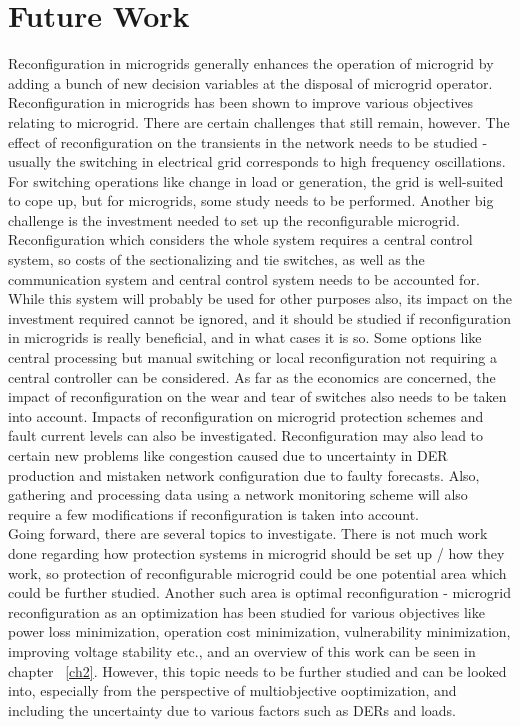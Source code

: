 \chapter{Future Work} \label{ch4}

Reconfiguration in microgrids generally enhances the operation of microgrid by adding a bunch of new decision variables at the disposal of microgrid operator. Reconfiguration in microgrids has been shown to improve various objectives relating to microgrid. 
There are certain challenges that still remain, however. The effect of reconfiguration on the transients in the network needs to be studied - usually the switching in electrical grid corresponds to high frequency oscillations. For switching operations like change in load or generation, the grid is well-suited to cope up, but for microgrids, some study needs to be performed\citep{mgrj18}. Another big challenge is the investment needed to set up the reconfigurable microgrid. Reconfiguration which considers the whole system requires a central control system, so costs of the sectionalizing and tie switches, as well as the communication system and central control system needs to be accounted for. While this system will probably be used for other purposes also, its impact on the investment required cannot be ignored, and it should be studied if reconfiguration in microgrids is really beneficial, and in what cases it is so. Some options like central processing but manual switching or local reconfiguration not requiring a central controller can be considered\citep{mgrj40}. As far as the economics are concerned, the impact of reconfiguration on the wear and tear of switches also needs to be taken into account\citep{mgrj40}. Impacts of reconfiguration on microgrid protection schemes and fault current levels can also be investigated. Reconfiguration may also lead to certain new problems like congestion caused due to uncertainty in DER production and mistaken network configuration due to faulty forecasts. Also, gathering and processing data using a network monitoring scheme will also require a few modifications if reconfiguration is taken into account.\\
Going forward, there are several topics to investigate. There is not much work done regarding how protection systems in microgrid should be set up / how they work, so protection of reconfigurable microgrid could be one potential area which could be further studied. Another such area is optimal reconfiguration - microgrid reconfiguration as an optimization has been studied for various objectives like power loss minimization, operation cost minimization, vulnerability minimization, improving voltage stability etc., and an overview of this work can be seen in chapter ~\ref{ch2}. However, this topic needs to be further studied and can be looked into, especially from the perspective of multiobjective ooptimization, and including the uncertainty due to various factors such as DERs and loads.
